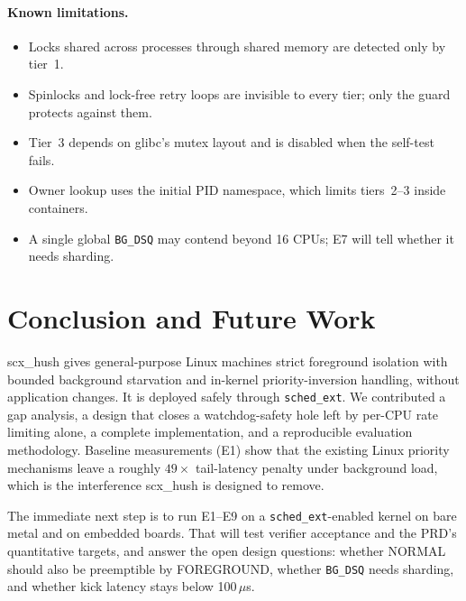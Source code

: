 \documentclass[11pt,a4paper]{article}
\newcommand{\code}[1]{\texttt{#1}}
\begin{document}
\paragraph{Known limitations.}
\begin{itemize}
\item Locks shared across processes through shared memory are detected only by
  tier~1.
\item Spinlocks and lock-free retry loops are invisible to every tier; only
  the guard protects against them.
\item Tier~3 depends on glibc's mutex layout and is disabled when the
  self-test fails.
\item Owner lookup uses the initial PID namespace, which limits tiers~2--3
  inside containers.
\item A single global \code{BG\_DSQ} may contend beyond 16 CPUs; E7 will tell
  whether it needs sharding.
\end{itemize}

\section{Conclusion and Future Work}
\label{sec:conclusion}

scx\_hush gives general-purpose Linux machines strict foreground isolation
with bounded background starvation and in-kernel priority-inversion handling,
without application changes. It is deployed safely through \code{sched\_ext}.
We contributed a gap analysis, a design that closes a watchdog-safety hole
left by per-CPU rate limiting alone, a complete implementation, and a
reproducible evaluation methodology. Baseline measurements (E1) show that
the existing Linux priority mechanisms leave a roughly $49\times$ tail-latency
penalty under background load, which is the interference scx\_hush is
designed to remove.

The immediate next step is to run E1--E9 on a \code{sched\_ext}-enabled kernel
on bare metal and on embedded boards. That will test verifier acceptance and
the PRD's quantitative targets, and answer the open design questions: whether
NORMAL should also be preemptible by FOREGROUND, whether \code{BG\_DSQ} needs
sharding, and whether kick latency stays below 100\,$\mu$s.



\end{document}
